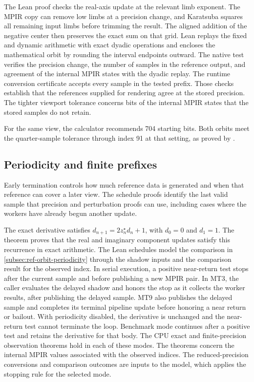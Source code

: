 The Lean proof checks the real-axis update at the relevant limb
exponent. The MPIR copy can remove low limbs at a precision change,
and Karatsuba squares all remaining input limbs before trimming the
result. The aligned addition of the negative center then preserves
the exact sum on that grid. Lean replays the fixed and dynamic
arithmetic with exact dyadic operations and encloses the mathematical
orbit by rounding the interval endpoints outward. The native test
verifies the precision change, the number of samples in the
reference output, and agreement of the internal MPIR states with
the dyadic replay. The runtime conversion certificate accepts every
sample in the tested prefix. Those checks establish that the
references supplied for rendering agree at the stored precision.
The tighter viewport tolerance concerns bits of the internal MPIR
states that the stored samples do not retain.

For the same view, the calculator recommends 704 starting bits.
Both orbits meet the quarter-sample tolerance through index 91 at
that setting, as proved by
.

\subsection{Periodicity and finite prefixes}
\label{subsec:reference-orbit-proof-periodicity}

Early termination controls how much reference data is generated and when
that reference can cover a later view. The schedule proofs identify
the last valid sample that precision and perturbation proofs can use,
including cases where the workers have already begun another update.

The exact derivative satisfies $d_{n+1}=2z_n^\star d_n+1$, with $d_0=0$
and $d_1=1$. The theorem  proves that the real and
imaginary component updates satisfy this recurrence in exact arithmetic.
The Lean schedules model the comparison in
\cref{subsec:ref-orbit-periodicity} through the shadow inputs and the
comparison result for the observed index. In serial execution, a positive
near-return test stops after the current sample and before publishing a new
MPIR pair. In MT3, the caller evaluates the delayed shadow and honors the
stop as it collects the worker results, after publishing the delayed sample.
MT9 also publishes the delayed sample and completes its terminal
pipeline update before honoring a near return or bailout.
With periodicity disabled, the derivative is unchanged and the near-return
test cannot terminate the loop. Benchmark mode continues after a positive
test and retains the derivative for that body. The CPU exact and
finite-precision observation theorems hold in each of these modes.
The theorems concern the internal MPIR values associated with the observed
indices. The reduced-precision conversions and comparison outcomes are
inputs to the model, which applies the stopping rule for the selected mode.

